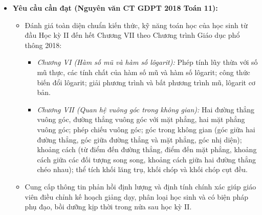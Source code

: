 \documentclass[12pt, a4paper]{article}
\begin{document}
\begin{itemize}[leftmargin=1.2cm]
    \item \textbf{Yêu cầu cần đạt (Nguyên văn CT GDPT 2018 Toán 11):}
    \begin{itemize}[leftmargin=0.6cm]
        \item Đánh giá toàn diện chuẩn kiến thức, kỹ năng toán học của học sinh từ đầu Học kỳ II đến hết Chương VII theo Chương trình Giáo dục phổ thông 2018:
        \begin{itemize}
            \item \textit{Chương VI (Hàm số mũ và hàm số lôgarit):} Phép tính lũy thừa với số mũ thực, các tính chất của hàm số mũ và hàm số lôgarit; công thức biến đổi lôgarit; giải phương trình và bất phương trình mũ, lôgarit cơ bản.
            \item \textit{Chương VII (Quan hệ vuông góc trong không gian):} Hai đường thẳng vuông góc, đường thẳng vuông góc với mặt phẳng, hai mặt phẳng vuông góc; phép chiếu vuông góc; góc trong không gian (góc giữa hai đường thẳng, góc giữa đường thẳng và mặt phẳng, góc nhị diện); khoảng cách (từ điểm đến đường thẳng, điểm đến mặt phẳng, khoảng cách giữa các đối tượng song song, khoảng cách giữa hai đường thẳng chéo nhau); thể tích khối lăng trụ, khối chóp và khối chóp cụt đều.
        \end{itemize}
        \item Cung cấp thông tin phản hồi định lượng và định tính chính xác giúp giáo viên điều chỉnh kế hoạch giảng dạy, phân loại học sinh và có biện pháp phụ đạo, bồi dưỡng kịp thời trong nửa sau học kỳ II.
    \end{itemize}


\end{itemize}
\end{document}
